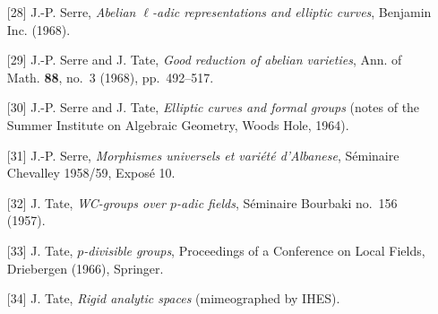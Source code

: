 \begin{enumerate}
{  r\'{e}siduel alg\'{e}briquement clos}, Bull. Soc. Math. France
  \textbf{89} (1961), pp.~105--154.
\item[{[28]}] J.-P. Serre, \emph{Abelian $\ell$-adic representations and
  elliptic curves}, Benjamin Inc. (1968).
\item[{[29]}] J.-P. Serre and J. Tate, \emph{Good reduction of abelian
  varieties}, Ann. of Math. \textbf{88}, no.~3 (1968), pp.~492--517.
\item[{[30]}] J.-P. Serre and J. Tate, \emph{Elliptic curves and formal
  groups} (notes of the Summer Institute on Algebraic Geometry, Woods
  Hole, 1964).
\item[{[31]}] J.-P. Serre, \emph{Morphismes universels et vari\'{e}t\'{e}
  d'Albanese}, S\'{e}minaire Chevalley 1958/59, Expos\'{e} 10.
\item[{[32]}] J. Tate, \emph{WC-groups over $p$-adic fields}, S\'{e}minaire
  Bourbaki no.~156 (1957).
\item[{[33]}] J. Tate, \emph{$p$-divisible groups}, Proceedings of a
  Conference on Local Fields, Driebergen (1966), Springer.
\item[{[34]}] J. Tate, \emph{Rigid analytic spaces} (mimeographed by
  IHES).
\end{enumerate}

